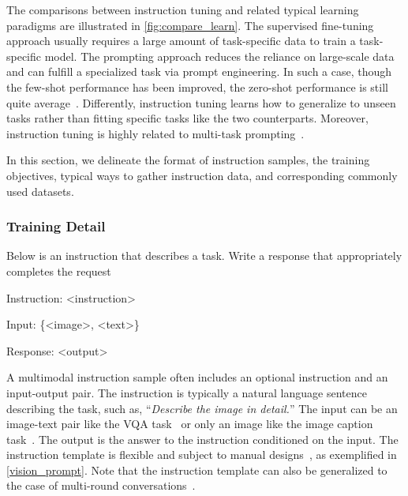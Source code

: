 The comparisons between instruction tuning and related typical learning paradigms are illustrated in \cref{fig:compare_learn}. 
The supervised fine-tuning approach usually requires a large amount of task-specific data to train a task-specific model.
The prompting approach reduces the reliance on large-scale data and can fulfill a specialized task via prompt engineering.
In such a case, though the few-shot performance has been improved, the zero-shot performance is still quite average~\cite{brown2020language}.
Differently, instruction tuning learns how to generalize to unseen tasks rather than fitting specific tasks like the two counterparts.
Moreover, instruction tuning is highly related to multi-task prompting~\cite{sanh2021multitask}.

In this section, we delineate the format of instruction samples, the training objectives, typical ways to gather instruction data, and corresponding commonly used datasets.


\subsubsection{Training Detail}
\label{sec:train_inst_tune_detail}


\begin{table}[!b]
\begin{tcolorbox}
Below is an instruction that describes a task. Write a response that appropriately completes the request \par\medskip

Instruction: \textcolor[rgb]{0,0,0.8}{<instruction>}

Input: \textcolor[rgb]{0,0,0.8}{\{<image>, <text>\}}\ 

Response: \textcolor[rgb]{0.8,0,0}{<output>}

\end{tcolorbox}
\caption{A simplified template to structure the multimodal instruction data. \textcolor[rgb]{0,0,0.8}{<instruction>} is a textual description of the task. \textcolor[rgb]{0,0,0.8}{\{<image>, <text>\}} and \textcolor[rgb]{0.8,0,0}{<output>} are input and output from the data sample. Note that \textcolor[rgb]{0,0,0.8}{<text>} in the input may be missed for some datasets, such as image caption datasets merely have \textcolor[rgb]{0,0,0.8}{<image>}. The example is adapted from~\cite{multimodal-gpt}.}
\label{vision_prompt}
\end{table}

A multimodal instruction sample often includes an optional instruction and an input-output pair. The instruction is typically a natural language sentence describing the task, such as, ``\textit{Describe the image in detail.}'' The input can be an image-text pair like the VQA task~\cite{antol2015vqa} or only an image like the image caption task~\cite{karpathy2015deep}. The output is the answer to the instruction conditioned on the input.
The instruction template is flexible and subject to manual designs~\cite{videochat, multimodal-gpt, llava}, as exemplified in \cref{vision_prompt}. Note that the instruction template can also be generalized to the case of multi-round conversations~\cite{multimodal-gpt, pmc-vqa, llava, pandagpt}.


